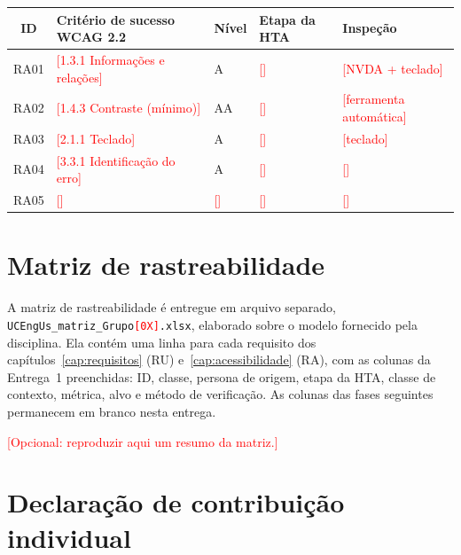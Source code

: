 \documentclass[
  12pt,
  oneside,
  a4paper,
  chapter=TITLE,
  section=TITLE,
  english,
  brazil
]{abntex2}
\newcommand{\preencher}[1]{\textcolor{red}{[#1]}}
\begin{document}
\begin{quadro}[htbp]
  \caption{Requisitos de acessibilidade}\label{qua:ra}
  \centering\small
  \begin{tabularx}{\textwidth}{|c|X|l|l|X|}\hline
    \textbf{ID} & \textbf{Critério de sucesso WCAG 2.2} & \textbf{Nível} & \textbf{Etapa da HTA} & \textbf{Inspeção} \\\hline
    RA01 & \preencher{1.3.1 Informações e relações} & A  & \preencher{} & \preencher{NVDA + teclado} \\\hline
    RA02 & \preencher{1.4.3 Contraste (mínimo)}     & AA & \preencher{} & \preencher{ferramenta automática} \\\hline
    RA03 & \preencher{2.1.1 Teclado}                & A  & \preencher{} & \preencher{teclado} \\\hline
    RA04 & \preencher{3.3.1 Identificação do erro}  & A  & \preencher{} & \preencher{} \\\hline
    RA05 & \preencher{}                             & \preencher{} & \preencher{} & \preencher{} \\\hline
  \end{tabularx}
\end{quadro}

\chapter{Matriz de rastreabilidade}\label{cap:matriz}

A matriz de rastreabilidade é entregue em arquivo separado,
\texttt{UCEngUs\_matriz\_Grupo\preencher{0X}.xlsx}, elaborado sobre o modelo
fornecido pela disciplina. Ela contém uma linha para cada requisito dos
capítulos~\ref{cap:requisitos} (RU) e~\ref{cap:acessibilidade} (RA), com as
colunas da Entrega~1 preenchidas: ID, classe, persona de origem, etapa da HTA,
classe de contexto, métrica, alvo e método de verificação. As colunas das fases
seguintes permanecem em branco nesta entrega.

\preencher{Opcional: reproduzir aqui um resumo da matriz.}

\chapter{Declaração de contribuição individual}\label{cap:contribuicao}
\end{document}
